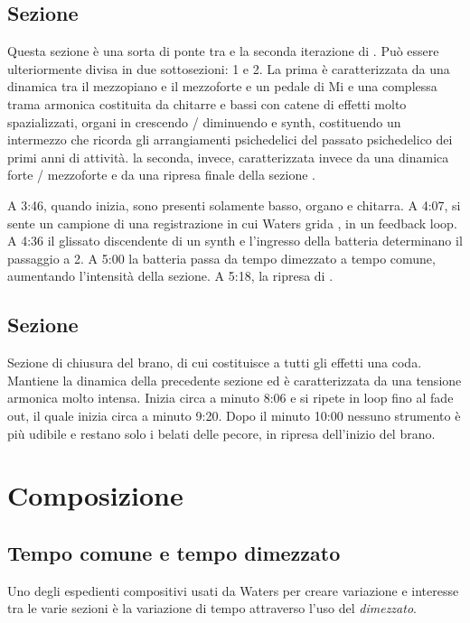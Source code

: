 \documentclass[class=book, crop=false, oneside, 12pt]{standalone}
\begin{document}
    \subsection{Sezione }
    Questa sezione è una sorta di ponte tra  e la seconda iterazione di . Può essere ulteriormente divisa in due sottosezioni: 1 e 2. La prima è caratterizzata da una dinamica tra il mezzopiano e il mezzoforte e un pedale di Mi e una complessa trama armonica costituita da chitarre e bassi con catene di effetti molto spazializzati, organi in crescendo / diminuendo e synth, costituendo un intermezzo che ricorda gli arrangiamenti psichedelici del passato psichedelico dei primi anni di attività.  la seconda, invece, caratterizzata invece da una dinamica forte / mezzoforte e da una ripresa finale della sezione .

    A 3:46, quando inizia, sono presenti solamente basso, organo e chitarra. A 4:07, si sente un campione  di una registrazione in cui Waters grida , in un feedback loop. A 4:36 il glissato discendente di un synth e l'ingresso della batteria determinano il passaggio a 2. A 5:00 la batteria passa da tempo dimezzato a tempo comune, aumentando l'intensità della sezione. A 5:18, la ripresa di .

    
    \subsection{Sezione }
    Sezione di chiusura del brano, di cui costituisce a tutti gli effetti una coda. Mantiene la dinamica della precedente sezione ed è caratterizzata da una tensione armonica molto intensa. Inizia circa a minuto 8:06 e si ripete in loop fino al fade out, il quale inizia circa a minuto 9:20. Dopo il minuto 10:00 nessuno strumento è più udibile e restano solo i belati delle pecore, in ripresa dell'inizio del brano.
    
    \section{Composizione}
    \label{sec:04-arrangement}

    \subsection{Tempo comune e tempo dimezzato}
    Uno degli espedienti compositivi usati da Waters per creare variazione e interesse tra le varie sezioni è la variazione di tempo attraverso l'uso del \emph{dimezzato}. 
\end{document}
